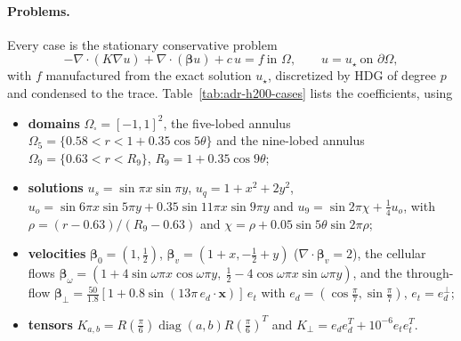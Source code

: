 \paragraph{Problems.} Every case is the stationary conservative problem
\begin{equation}
 -\nabla\cdot(K\nabla u)+\nabla\cdot(\boldsymbol\beta u)+c\,u=f\ \text{in }\Omega,\qquad
 u=u_\star\ \text{on }\partial\Omega,
 \label{eq:adr-h200-problem}
\end{equation}
with $f$ manufactured from the exact solution $u_\star$, discretized by HDG of degree $p$ and
condensed to the trace. Table~\ref{tab:adr-h200-cases} lists the coefficients, using
\begin{itemize}
\item \textbf{domains} $\Omega_\square=[-1,1]^2$, the five-lobed annulus
  $\Omega_5=\{0.58<r<1+0.35\cos5\theta\}$ and the nine-lobed annulus
  $\Omega_9=\{0.63<r<R_9\}$, $R_9=1+0.35\cos9\theta$;
\item \textbf{solutions} $u_s=\sin\pi x\sin\pi y$, $u_q=1+x^2+2y^2$,
  $u_o=\sin6\pi x\sin5\pi y+0.35\sin11\pi x\sin9\pi y$ and
  $u_9=\sin2\pi\chi+\tfrac14u_o$, with $\rho=(r-0.63)/(R_9-0.63)$ and
  $\chi=\rho+0.05\sin5\theta\sin2\pi\rho$;
\item \textbf{velocities} $\boldsymbol\beta_0=(1,\tfrac12)$, $\boldsymbol\beta_v=(1+x,-\tfrac12+y)$
  ($\nabla\cdot\boldsymbol\beta_v=2$), the cellular flows
  $\boldsymbol\beta_\omega=(1+4\sin\omega\pi x\cos\omega\pi y,\ \tfrac12-4\cos\omega\pi x\sin\omega\pi y)$,
  and the through-flow $\boldsymbol\beta_\perp=\tfrac{50}{1.8}[1+0.8\sin(13\pi\,e_d\cdot\boldsymbol x)]\,e_t$
  with $e_d=(\cos\tfrac\pi7,\sin\tfrac\pi7)$, $e_t=e_d^\perp$;
\item \textbf{tensors} $K_{a,b}=R(\tfrac\pi6)\operatorname{diag}(a,b)R(\tfrac\pi6)^T$ and
  $K_\perp=e_de_d^T+10^{-6}e_te_t^T$.
\end{itemize}

